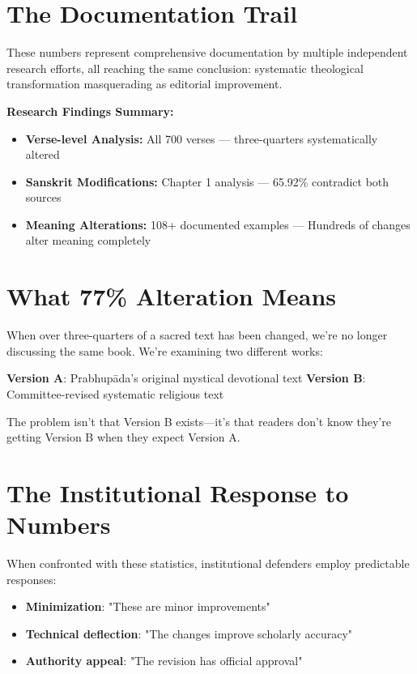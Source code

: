 \documentclass[11pt,twoside]{book}
\begin{document}
\section*{The Documentation Trail}
\label{sec:orge0e5c22}

These numbers represent comprehensive documentation by multiple independent research efforts, all reaching the same conclusion: systematic theological transformation masquerading as editorial improvement.

\textbf{\textbf{Research Findings Summary:}}

\begin{itemize}
\item \textbf{\textbf{Verse-level Analysis:}} All 700 verses — three-quarters systematically altered
\item \textbf{\textbf{Sanskrit Modifications:}} Chapter 1 analysis — 65.92\% contradict both sources
\item \textbf{\textbf{Meaning Alterations:}} 108+ documented examples — Hundreds of changes alter meaning completely
\end{itemize}
\section*{What 77\% Alteration Means}
\label{sec:org81e399f}

When over three-quarters of a sacred text has been changed, we're no longer discussing the same book. We're examining two different works:

\textbf{\textbf{Version A}}: Prabhupāda's original mystical devotional text
\textbf{\textbf{Version B}}: Committee-revised systematic religious text

The problem isn't that Version B exists—it's that readers don't know they're getting Version B when they expect Version A.
\section*{The Institutional Response to Numbers}
\label{sec:org942d1bd}

When confronted with these statistics, institutional defenders employ predictable responses:

\begin{itemize}
\item \textbf{\textbf{Minimization}}: "These are minor improvements"
\item \textbf{\textbf{Technical deflection}}: "The changes improve scholarly accuracy"
\item \textbf{\textbf{Authority appeal}}: "The revision has official approval"
\end{itemize}
\end{document}

